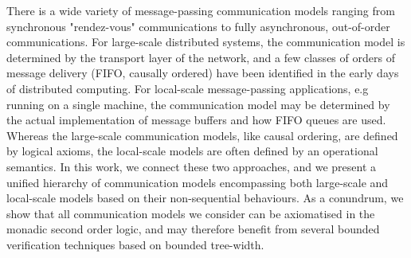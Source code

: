 There is a wide variety of message-passing communication models ranging from synchronous "rendez-vous" 
communications to fully asynchronous, out-of-order communications. For large-scale distributed systems, the
communication model is determined by the transport layer of the network, and a few classes of 
orders of message delivery (FIFO, causally ordered) have been identified in the early days of 
distributed computing. For local-scale message-passing applications, 
e.g running on a single machine, the communication model may be determined by the actual implementation of 
message buffers and how FIFO queues are used. Whereas the large-scale communication
models, like causal ordering, are defined by logical axioms, the local-scale models are often defined by an operational
semantics. In this work, we connect these two approaches, and we present a unified hierarchy of communication
models encompassing both large-scale and local-scale models based on their non-sequential behaviours.
As a conundrum, we show that all communication models we consider can be axiomatised in the monadic second order logic,
and may therefore benefit from several bounded verification techniques based on bounded tree-width.